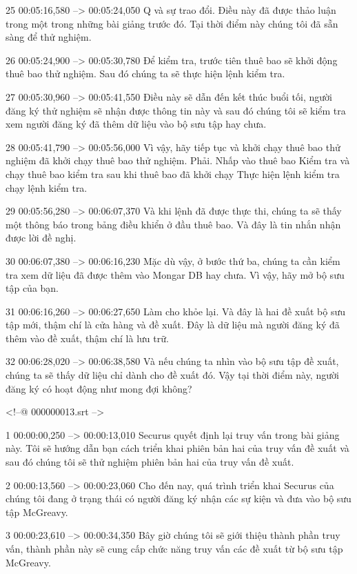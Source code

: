 25
00:05:16,580 --> 00:05:24,050
Q và sự trao đổi.  Điều này đã được thảo luận trong một trong những bài giảng trước đó.  Tại thời điểm này chúng tôi đã sẵn sàng để thử nghiệm.

26
00:05:24,900 --> 00:05:30,780
Để kiểm tra, trước tiên thuê bao sẽ khởi động thuê bao thử nghiệm.  Sau đó chúng ta sẽ thực hiện lệnh kiểm tra.

27
00:05:30,960 --> 00:05:41,550
Điều này sẽ dẫn đến kết thúc buổi tối, người đăng ký thử nghiệm sẽ nhận được thông tin này và sau đó chúng tôi sẽ kiểm tra xem người đăng ký đã thêm dữ liệu vào bộ sưu tập hay chưa.

28
00:05:41,790 --> 00:05:56,000
Vì vậy, hãy tiếp tục và khởi chạy thuê bao thử nghiệm đã khởi chạy thuê bao thử nghiệm.  Phải.  Nhấp vào thuê bao Kiểm tra và chạy thuê bao kiểm tra sau khi thuê bao đã khởi chạy Thực hiện lệnh kiểm tra chạy lệnh kiểm tra.

29
00:05:56,280 --> 00:06:07,370
Và khi lệnh đã được thực thi, chúng ta sẽ thấy một thông báo trong bảng điều khiển ở đầu thuê bao.  Và đây là tin nhắn nhận được lời đề nghị.

30
00:06:07,380 --> 00:06:16,230
Mặc dù vậy, ở bước thứ ba, chúng ta cần kiểm tra xem dữ liệu đã được thêm vào Mongar DB hay chưa.  Vì vậy, hãy mở bộ sưu tập của bạn.

31
00:06:16,260 --> 00:06:27,650
Làm cho khỏe lại.  Và đây là hai đề xuất bộ sưu tập mới, thậm chí là cửa hàng và đề xuất.  Đây là dữ liệu mà người đăng ký đã thêm vào đề xuất, thậm chí là lưu trữ.

32
00:06:28,020 --> 00:06:38,580
Và nếu chúng ta nhìn vào bộ sưu tập đề xuất, chúng ta sẽ thấy dữ liệu chỉ dành cho đề xuất đó.  Vậy tại thời điểm này, người đăng ký có hoạt động như mong đợi không?

<!--@ 000000013.srt -->

1
00:00:00,250 --> 00:00:13,010
Securus quyết định lại truy vấn trong bài giảng này.  Tôi sẽ hướng dẫn bạn cách triển khai phiên bản hai của truy vấn đề xuất và sau đó chúng tôi sẽ thử nghiệm phiên bản hai của truy vấn đề xuất.

2
00:00:13,560 --> 00:00:23,060
Cho đến nay, quá trình triển khai Securus của chúng tôi đang ở trạng thái có người đăng ký nhận các sự kiện và đưa vào bộ sưu tập McGreavy.

3
00:00:23,610 --> 00:00:34,350
Bây giờ chúng tôi sẽ giới thiệu thành phần truy vấn, thành phần này sẽ cung cấp chức năng truy vấn các đề xuất từ ​​bộ sưu tập McGreavy.

